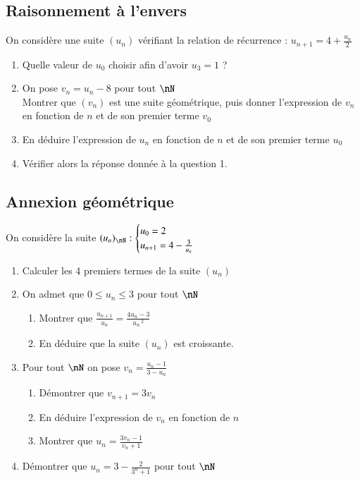 \documentclass[oneside,12pt]{article}          %
\begin{document}
\subsection{Raisonnement à l'envers}
On considère une suite $(u_n)$ vérifiant la relation de récurrence : $u_{n+1}=4+\frac{u_n}{2}$
\begin{enumerate}
    \item Quelle valeur de $u_{0}$ choisir afin d'avoir $u_{3}=1$ ?
    \item On pose $v_n=u_n-8$ pour tout $\nN$ \\
    Montrer que $(v_n)$ est une suite géométrique, puis donner l'expression de $v_{n}$ en fonction de $n$ et de son premier terme $v_{0}$ 
    \item En déduire l'expression de $u_n$ en fonction de $n$ et de son premier terme $u_{0}$
    \item Vérifier alors la réponse donnée à la question 1.
\end{enumerate}



\subsection{Annexion géométrique}
On considère la suite $(u_n)_{\nN}:\begin{cases}u_0=2\\u_{n+1}=4-\frac{3}{u_n}\end{cases}$
\begin{enumerate}
	\item Calculer les 4 premiers termes de la suite $(u_n)$
	\item On admet que $0\leq u_n\leq3$ pour tout $\nN$
	\begin{enumerate}
		\item Montrer que $\frac{u_{n+1}}{u_n}=\frac{4u_n-3}{u_n\,^2}$
		\item En déduire que la suite $(u_n)$ est croissante.
	\end{enumerate}
	\item Pour tout $\nN$ on pose $v_n=\frac{u_n-1}{3-u_n}$
	\begin{enumerate}
		\item Démontrer que $v_{n+1}=3v_n$
		\item En déduire l'expression de $v_n$ en fonction de $n$
		\item Montrer que $u_n=\frac{3v_n-1}{v_n+1}$
	\end{enumerate}
	\item Démontrer que $u_n=3-\frac{2}{3^n+1}$ pour tout $\nN$
\end{enumerate}
\end{document}
